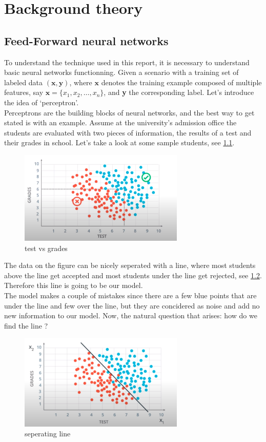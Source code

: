 \chapter{Background theory}
\section{Feed-Forward neural networks}
To understand the technique used in this report, it is necessary to understand basic neural networks functionning.
Given a scenario with a training set of labeled data $(\textbf{x}, \textbf{y})$, where $\textbf{x}$ denotes the training example
composed of multiple features, say $\textbf{x} = \{x_{1}, x_{2}, \ldots, x_{n}\}$, and \textbf{y} the corresponding label.
Let's introduce the idea of `perceptron'. \\
Perceptrons are the building blocks of neural networks, and the best way to get stated is with an example.
Assume at the university's admission office the students are evaluated with two pieces of information, the results of a test and their grades in school. Let's take a look at some sample students, see \cref{fig:perceptron}.

\begin{figure}[ht]
  \centering
  \includegraphics[width=0.7\textwidth]{figs/fig1.png}
  \caption{test vs grades }\label{fig:perceptron}
\end{figure}

The data on the figure can be nicely seperated with a line, where most students above the line get accepted and most students under the line get rejected, see \cref{fig:line}. Therefore this line is going to be our model. \\
The model makes a couple of mistakes since there are a few blue points that are under the line and few over the line, but they are concidered as noise and add no new information to our model. Now, the natural question that arises: how do we find the line ?

\begin{figure}[htbp]
  \centering
  \includegraphics[width=0.7\textwidth]{figs/fig2.png}
  \caption{seperating line}\label{fig:line}
\end{figure}

